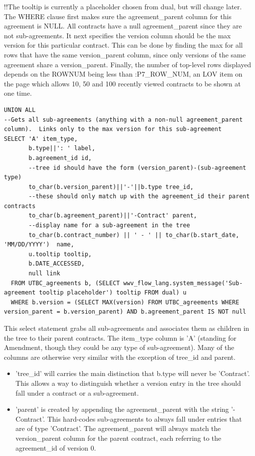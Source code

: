 \documentclass{report}
\begin{document}
!!The tooltip is currently a placeholder chosen from dual, but will change later.
The WHERE clause first makes sure the agreement\_parent column for this agreement is NULL.  All contracts have a null agreement\_parent since they are not sub-agreements.  It next specifies the version column should be the max version for this particular contract.  This can be done by finding the max for all rows that have the same version\_parent column, since only versions of the same agreement share a version\_parent.  Finally, the number of top-level rows displayed depends on the ROWNUM being less than :P7\_ROW\_NUM, an LOV item on the page which allows 10, 50 and 100 recently viewed contracts to be shown at one time.
\begin{lstlisting}[caption=Select statement grabbing all sub-agreements and piling them under their parent contracts.]
UNION ALL
--Gets all sub-agreements (anything with a non-null agreement_parent column).  Links only to the max version for this sub-agreement
SELECT 'A' item_type,
       b.type||': ' label,
       b.agreement_id id,
       --tree id should have the form (version_parent)-(sub-agreement type)
       to_char(b.version_parent)||'-'||b.type tree_id,
       --these should only match up with the agreement_id their parent contracts
       to_char(b.agreement_parent)||'-Contract' parent,
       --display name for a sub-agreement in the tree
       to_char(b.contract_number) || ' - ' || to_char(b.start_date, 'MM/DD/YYYY')  name,
       u.tooltip tooltip,
       b.DATE_ACCESSED,
       null link
  FROM UTBC_agreements b, (SELECT wwv_flow_lang.system_message('Sub-agreement tooltip placeholder') tooltip FROM dual) u
  WHERE b.version = (SELECT MAX(version) FROM UTBC_agreements WHERE version_parent = b.version_parent) AND b.agreement_parent IS NOT null
\end{lstlisting}
This select statement grabs all sub-agreements and associates them as children in the tree to their parent contracts.  The item\_type column is 'A' (standing for Amendment, though they could be any type of sub-agreement).  Many of the columns are otherwise very similar with the exception of tree\_id and parent.
\begin{itemize}
	\item 'tree\_id' will carries the main distinction that b.type will never be 'Contract'.  This allows a way to distinguish whether a version entry in the tree should fall under a contract or a sub-agreement.
	\item 'parent' is created by appending the agreement\_parent with the string '-Contract'.  This hard-codes sub-agreements to always fall under entries that are of type 'Contract'.  The agreement\_parent will always match the version\_parent column for the parent contract, each referring to the agreement\_id of version 0.
\end{itemize}
\end{document}
